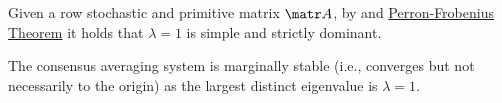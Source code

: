 \begin{lemma}
    Given a row stochastic and primitive matrix $\A$, by  and \hyperref[th:perron_frobenius]{Perron-Frobenius Theorem} it holds that $\lambda = 1$ is simple and strictly dominant.

    \indenttbox
    \begin{corollary}
        The consensus averaging system is marginally stable (i.e., converges but not necessarily to the origin) as the largest distinct eigenvalue is $\lambda = 1$.
    \end{corollary}
\end{lemma}










